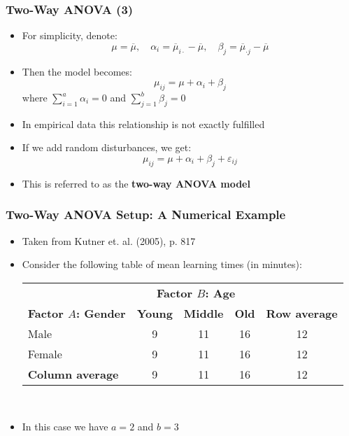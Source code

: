 \documentclass[10pt]{beamer}
\theoremstyle{definition}
\begin{document}
\begin{frame}[fragile]
\frametitle{Two-Way ANOVA (3)}
\begin{itemize}
	\item For simplicity, denote:
	\[
		\mu = \overline{\mu},\quad \alpha_{i} = \overline{\mu}_{i\cdot} - \overline{\mu},\quad \beta_{j} = \overline{\mu}_{\cdot j} - \overline{\mu}
	\]
	\item Then the model becomes:
	\[
		\mu_{ij} = \mu + \alpha_{i} + \beta_{j}
	\]
	where $\displaystyle \sum_{i=1}^{a}\alpha_{i} = 0$ and $\displaystyle \sum_{j=1}^{b}\beta_{j} = 0$
	\item In empirical data this relationship is not exactly fulfilled
	\item If we add random disturbances, we get:
	\[
		\mu_{ij} = \mu + \alpha_{i} + \beta_{j} + \varepsilon_{ij}
	\]
	\item This is referred to as the \textbf{two-way ANOVA model} 
\end{itemize}
\end{frame}

\begin{frame}[fragile]
\frametitle{Two-Way ANOVA Setup: A Numerical Example}
\begin{itemize}
	\item Taken from Kutner et. al. (2005), p. 817
	\item Consider the following table of mean learning times (in minutes):
	\bigskip\\
	\begin{tabular}{l|ccc|c}
		\toprule
		& \multicolumn{3}{c|}{\textbf{Factor $B$: Age}}\\
		\cline{2-4}
		\textbf{Factor $A$: Gender} & \textbf{Young} & \textbf{Middle} & \textbf{Old} & \textbf{Row average}\\ 
		\midrule
		Male & 9 & 11 & 16 & 12\\
		Female & 9 & 11 & 16 & 12\\
		\midrule
		\textbf{Column average} & 9 & 11 & 16 & 12\\
		\bottomrule
	\end{tabular} 
	\bigskip\\
	\item In this case we have $a=2$ and $b=3$
\end{itemize}
\end{frame}
\end{document}
